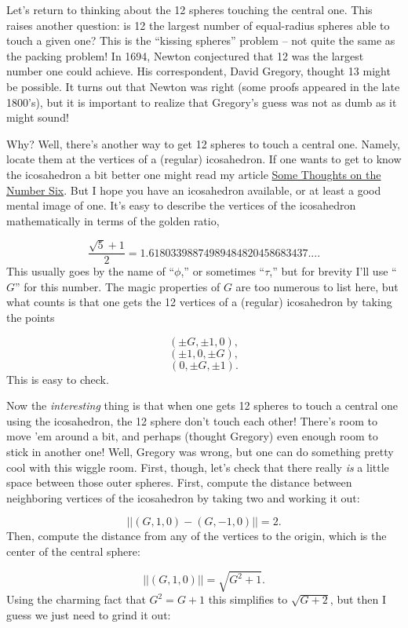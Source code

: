 Let's return to thinking about the 12 spheres touching the central one. This raises another question: is 12 the largest number of equal-radius spheres able to touch a given one? This is the ``kissing spheres'' problem -- not quite the same as the packing problem! In 1694, Newton conjectured that 12 was the largest number one could achieve. His correspondent, David Gregory, thought 13 might be possible. It turns out that Newton was right (some proofs appeared in the late 1800's), but it is important to realize that Gregory's guess was not as dumb as it might sound!

Why? Well, there's another way to get 12 spheres to touch a central one. Namely, locate them at the vertices of a (regular) icosahedron. If one wants to get to know the icosahedron a bit better one might read my article \href{http://math.ucr.edu/home/baez/six.html}{Some Thoughts on the Number Six}. But I hope you have an icosahedron available, or at least a good mental image of one. It's easy to describe the vertices of the icosahedron mathematically in terms of the golden ratio,

\[ \frac{\sqrt{5} + 1}{2} = 1.61803398874989484820458683437....\]
This usually goes by the name of ``$\phi$,'' or sometimes ``$\tau$,'' but for brevity I'll use ``$G$'' for this number. The magic properties of $G$ are too numerous to list here, but what counts is that one gets the 12 vertices of a (regular) icosahedron by taking the points

\[                (\pm G, \pm 1, 0),\]
\[                (\pm 1, 0, \pm G),\]
\[                (0, \pm G, \pm 1).\]
This is easy to check.

Now the \emph{interesting} thing is that when one gets 12 spheres to touch a central one using the icosahedron, the 12 sphere don't touch each other! There's room to move 'em around a bit, and perhaps (thought Gregory) even enough room to stick in another one! Well, Gregory was wrong, but one can do something pretty cool with this wiggle room. First, though, let's check that there really \emph{is} a little space between those outer spheres. First, compute the distance between neighboring vertices of the icosahedron by taking two and working it out:

\[               ||(G,1,0) - (G,-1,0)|| = 2.\]
Then, compute the distance from any of the vertices to the origin, which is the center of the central sphere:

\[               ||(G,1,0)|| = \sqrt{G^2 + 1}.\]
Using the charming fact that $G^2 = G + 1$ this simplifies to $\sqrt{G + 2}$, but then I guess we just need to grind it out:

